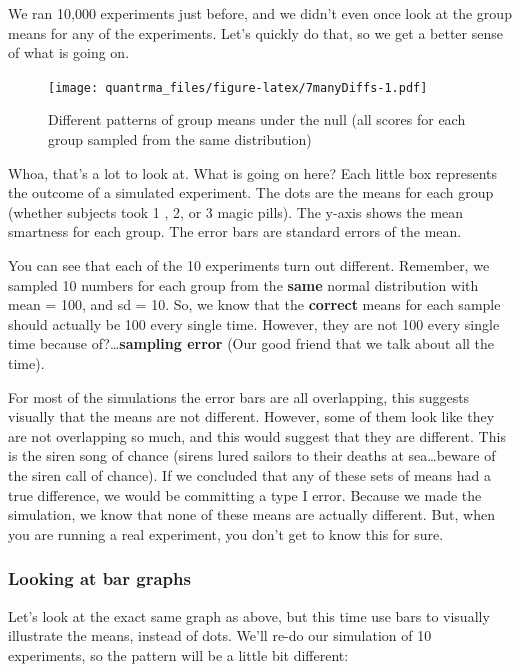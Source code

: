 \documentclass[
]{book}
\begin{document}
We ran 10,000 experiments just before, and we didn't even once look at the group means for any of the experiments. Let's quickly do that, so we get a better sense of what is going on.

\begin{figure}
\centering
\texttt{[image: quantrma\_files/figure-latex/7manyDiffs-1.pdf]}
\caption{\label{fig:7manyDiffs}Different patterns of group means under the null (all scores for each group sampled from the same distribution)}
\end{figure}

Whoa, that's a lot to look at. What is going on here? Each little box represents the outcome of a simulated experiment. The dots are the means for each group (whether subjects took 1 , 2, or 3 magic pills). The y-axis shows the mean smartness for each group. The error bars are standard errors of the mean.

You can see that each of the 10 experiments turn out different. Remember, we sampled 10 numbers for each group from the \textbf{same} normal distribution with mean = 100, and sd = 10. So, we know that the \textbf{correct} means for each sample should actually be 100 every single time. However, they are not 100 every single time because of?\ldots{}\textbf{sampling error} (Our good friend that we talk about all the time).

For most of the simulations the error bars are all overlapping, this suggests visually that the means are not different. However, some of them look like they are not overlapping so much, and this would suggest that they are different. This is the siren song of chance (sirens lured sailors to their deaths at sea\ldots beware of the siren call of chance). If we concluded that any of these sets of means had a true difference, we would be committing a type I error. Because we made the simulation, we know that none of these means are actually different. But, when you are running a real experiment, you don't get to know this for sure.

\hypertarget{looking-at-bar-graphs}{%
\subsubsection{Looking at bar graphs}\label{looking-at-bar-graphs}}

Let's look at the exact same graph as above, but this time use bars to visually illustrate the means, instead of dots. We'll re-do our simulation of 10 experiments, so the pattern will be a little bit different:
\end{document}
